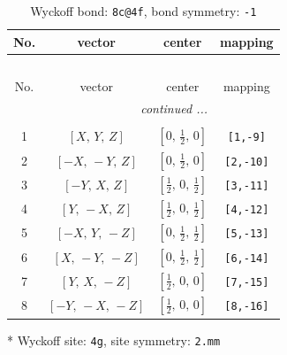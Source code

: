 \documentclass[fleqn,8pt]{jsarticle}
\begin{document}
\renewcommand{\arraystretch}{1.2}
\begin{longtable}{cccc}
\caption{Wyckoff bond: {\tt 8c@4f}, bond symmetry: {\tt -1}}
 \\
 \hline \hline
No. & vector & center & mapping \\ \hline \endfirsthead

\multicolumn{3}{l}{\tablename\ \thetable{}} \\
 \hline \hline
No. & vector & center & mapping \\ \hline \endhead

 \hline \hline
\multicolumn{3}{r}{\footnotesize\it continued ...} \\ \endfoot

 \hline \hline
\multicolumn{3}{r}{} \\ \endlastfoot

1 & $\left[ X,\, Y,\, Z \right]$ & $\left[ 0,\, \frac{1}{2},\, 0 \right]$ & {\tt [1,-9]} \\ \hline
2 & $\left[ - X,\, - Y,\, Z \right]$ & $\left[ 0,\, \frac{1}{2},\, 0 \right]$ & {\tt [2,-10]} \\ \hline
3 & $\left[ - Y,\, X,\, Z \right]$ & $\left[ \frac{1}{2},\, 0,\, \frac{1}{2} \right]$ & {\tt [3,-11]} \\ \hline
4 & $\left[ Y,\, - X,\, Z \right]$ & $\left[ \frac{1}{2},\, 0,\, \frac{1}{2} \right]$ & {\tt [4,-12]} \\ \hline
5 & $\left[ - X,\, Y,\, - Z \right]$ & $\left[ 0,\, \frac{1}{2},\, \frac{1}{2} \right]$ & {\tt [5,-13]} \\ \hline
6 & $\left[ X,\, - Y,\, - Z \right]$ & $\left[ 0,\, \frac{1}{2},\, \frac{1}{2} \right]$ & {\tt [6,-14]} \\ \hline
7 & $\left[ Y,\, X,\, - Z \right]$ & $\left[ \frac{1}{2},\, 0,\, 0 \right]$ & {\tt [7,-15]} \\ \hline
8 & $\left[ - Y,\, - X,\, - Z \right]$ & $\left[ \frac{1}{2},\, 0,\, 0 \right]$ & {\tt [8,-16]} \\
\end{longtable}
* Wyckoff site: {\tt 4g}, site symmetry: {\tt 2.mm}
\renewcommand{\arraystretch}{1.2}
\end{document}
